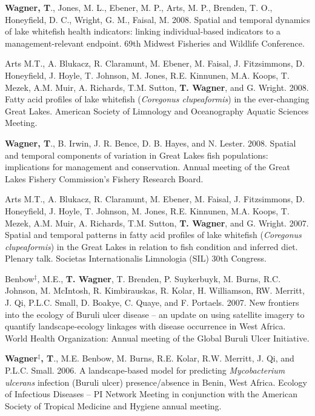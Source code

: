 \documentclass[10pt]{article}
\begin{document}
\begin{flushleft}
\begin{etaremune}
\item {\bf Wagner, T}., Jones, M. L., Ebener, M. P., Arts, M. P., Brenden, T. O., Honeyfield, D. C., Wright, G. M., Faisal, M. 2008. Spatial and temporal dynamics of lake whitefish health indicators: linking individual-based indicators to a management-relevant endpoint. 69th Midwest Fisheries and Wildlife Conference.

\item Arts M.T., A. Blukacz, R. Claramunt, M. Ebener, M. Faisal, J. Fitzsimmons, D. Honeyfield, J. Hoyle, T. Johnson, M. Jones, R.E. Kinnunen, M.A. Koops, T. Mezek, A.M. Muir, A. Richards, T.M. Sutton, {\bf T. Wagner}, and G. Wright. 2008. Fatty acid profiles of lake whitefish (\emph{Coregonus clupeaformis}) in the ever-changing Great Lakes. American Society of Limnology and Oceanography Aquatic Sciences Meeting.

\item {\bf Wagner, T}., B. Irwin, J. R. Bence, D. B. Hayes, and N. Lester. 2008. Spatial and temporal components of variation in Great Lakes fish populations: implications for management and conservation.  Annual meeting of the Great Lakes Fishery Commission’s Fishery Research Board.


\item Arts M.T., A. Blukacz, R. Claramunt, M. Ebener, M. Faisal, J. Fitzsimmons, D. Honeyfield, J. Hoyle, T. Johnson, M. Jones, R.E. Kinnunen, M.A. Koops, T. Mezek, A.M. Muir, A. Richards, T.M. Sutton, {\bf T. Wagner}, and G. Wright. 2007. Spatial and temporal patterns in fatty acid profiles of lake whitefish (\emph{Coregonus clupeaformis}) in the Great Lakes in relation to fish condition and inferred diet. Plenary talk. Societas Internationalis Limnologia (SIL) 30th Congress. 

\item Benbow$^\ddagger$, M.E., {\bf T. Wagner}, T. Brenden, P. Suykerbuyk, M. Burns, R.C. Johnson, M. McIntosh, R. Kimbirauskas, R. Kolar, H. Williamson, RW. Merritt, J. Qi, P.L.C. Small, D. Boakye, C. Quaye, and F. Portaels. 2007. New frontiers into the ecology of Buruli ulcer disease – an update on using satellite imagery to quantify landscape-ecology linkages with disease occurrence in West Africa. World Health Organization: Annual meeting of the Global Buruli Ulcer Initiative.


\item {\bf Wagner$^\ddagger$, T}., M.E. Benbow, M. Burns, R.E. Kolar, R.W. Merritt, J. Qi, and P.L.C. Small. 2006. A landscape-based model for predicting \emph{Mycobacterium ulcerans} infection (Buruli ulcer) presence/absence in Benin, West Africa. Ecology of Infectious Diseases – PI Network Meeting in conjunction with the American Society of Tropical Medicine and Hygiene annual meeting. 


\end{etaremune}
\end{flushleft}
\end{document}
